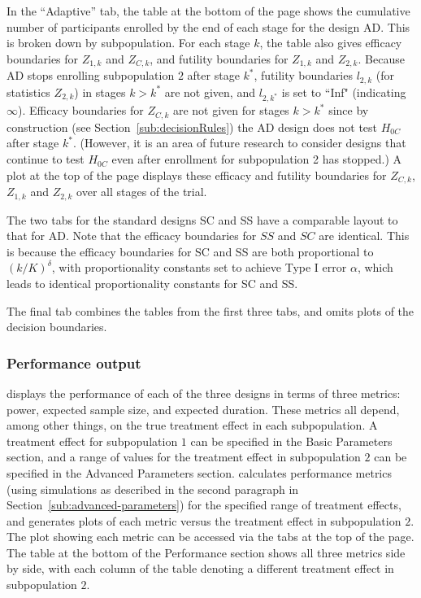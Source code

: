 \documentclass[article]{jss}
\begin{document}
In the ``Adaptive'' tab, the table at the bottom of the page shows the cumulative number of participants enrolled by the end of each stage for the design AD. This is broken down by subpopulation. For each stage $k$, the table also gives efficacy boundaries for $Z_{1,k}$ and $Z_{C,k}$, and futility boundaries for $Z_{1,k}$ and $Z_{2,k}$. Because AD  stops enrolling subpopulation $2$ after stage $k^*$, futility boundaries $l_{2,k}$ (for statistics $Z_{2,k}$) in stages $k>k^*$  are not given, and $l_{2,k^*}$ is set to ``Inf" (indicating $\infty$). %
Efficacy boundaries for $Z_{C,k}$ are not given for stages $k>k^*$ since by construction (see Section~\ref{sub:decisionRules}) the AD design does not test $H_{0C}$ after stage $k^*$. (However, it is an area of future research to consider designs that continue to test $H_{0C}$ even after enrollment for subpopulation 2 has stopped.) A plot at the top of the page displays these efficacy and futility boundaries for $Z_{C,k}$, $Z_{1,k}$ and $Z_{2,k}$ over all stages of the trial.

The two tabs for the standard designs SC and SS have a comparable layout to that for AD. Note that the efficacy boundaries for $SS$ and $SC$ are identical. This is because the efficacy boundaries for SC and SS are both proportional to $(k/K)^\delta$, with proportionality constants set to achieve Type I error $\alpha$, which leads to identical proportionality constants for SC and SS.

The final tab combines the tables from the first three tabs, and omits plots of the decision boundaries.


\subsubsection{Performance output}
\label{sub:performance-output}

 displays the performance of each of the three designs in terms of three metrics: power, expected sample size, and expected duration. These metrics all depend, among other things, on the true treatment effect in each subpopulation. A treatment effect for subpopulation $1$ can be specified in the Basic Parameters section, and a range of values for the treatment effect in subpopulation $2$ can be specified in the Advanced Parameters section.  calculates performance metrics (using simulations as described in the second paragraph in Section~\ref{sub:advanced-parameters}) for the specified range of treatment effects, and generates plots  of each metric versus the treatment effect in subpopulation $2$. The plot showing each metric can be accessed via the tabs at the top of the page. The table at the bottom of the Performance section shows all three metrics side by side, with each column of the table denoting a different treatment effect in subpopulation $2$.
\end{document}
